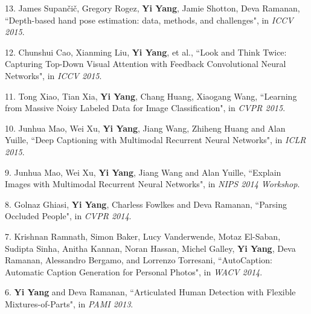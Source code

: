 \documentclass[margin]{res3}
\newenvironment{list1}{
  \begin{list}{\ding{113}}{%
      \setlength{\itemsep}{0.03in}
      \setlength{\parsep}{0in} \setlength{\parskip}{0in}
      \setlength{\topsep}{0in} \setlength{\partopsep}{0in}
      \setlength{\leftmargin}{0in}}}{\end{list}}
\begin{document}
\begin{resume}
\begin{list1}
\item[] 13. James Supan\v{c}i\v{c}, Gregory Rogez, {\bf Yi Yang}, Jamie Shotton, Deva Ramanan, 
``Depth-based hand pose estimation: data, methods, and challenges",
in \textit{ICCV 2015}.

\item[] 12. Chunshui Cao, Xianming Liu, {\bf Yi Yang}, et al.,
``Look and Think Twice: Capturing Top-Down Visual Attention with Feedback Convolutional Neural Networks",
in \textit{ICCV 2015}. 

\item[] 11. Tong Xiao, Tian Xia, {\bf Yi Yang}, Chang Huang, Xiaogang Wang,
``Learning from Massive Noisy Labeled Data for Image Classification",
in \textit{CVPR 2015}.

\item[] 10. Junhua Mao, Wei Xu, {\bf Yi Yang}, Jiang Wang, Zhiheng Huang and Alan Yuille,
``Deep Captioning with Multimodal Recurrent Neural Networks",
in \textit{ICLR 2015}.

\item[] 9. Junhua Mao, Wei Xu, {\bf Yi Yang}, Jiang Wang and Alan Yuille,
``Explain Images with Multimodal Recurrent Neural Networks",
in \textit{NIPS 2014 Workshop}.

\item[] 8. Golnaz Ghiasi, {\bf Yi Yang}, Charless Fowlkes and Deva Ramanan, 
``Parsing Occluded People", 
in \textit{CVPR 2014}.

\item[] 7. Krishnan Ramnath, Simon Baker, Lucy Vanderwende, Motaz El-Saban, Sudipta Sinha, Anitha Kannan, Noran Hassan, Michel Galley, {\bf Yi Yang}, Deva Ramanan, Alessandro Bergamo, and Lorrenzo Torresani, 
``AutoCaption: Automatic Caption Generation for Personal Photos", 
in \textit{WACV 2014}.

\item[] 6. {\bf Yi Yang} and Deva Ramanan, 
``Articulated Human Detection with Flexible Mixtures-of-Parts", 
in \textit{PAMI 2013}.


\end{list1}
\end{resume}
\end{document}
